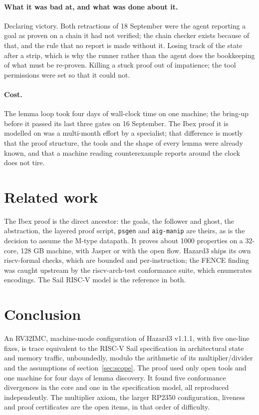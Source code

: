 \documentclass[11pt]{article}
\newcommand{\code}[1]{\texttt{#1}}
\begin{document}
\paragraph{What it was bad at, and what was done about it.}
Declaring victory. Both retractions of 18 September were the agent reporting a
goal as proven on a chain it had not verified; the chain checker exists
because of that, and the rule that no report is made without it. Losing track
of the state after a strip, which is why the runner rather than the agent
does the bookkeeping of what must be re-proven. Killing a stuck proof out of
impatience; the tool permissions were set so that it could not.

\paragraph{Cost.}
The lemma loop took four days of wall-clock time on one machine; the
bring-up before it passed its last three gates on 16 September. The Ibex proof it is modelled on was a multi-month effort by
a specialist; that difference is mostly that the proof structure, the tools
and the shape of every lemma were already known, and that a machine reading
counterexample reports around the clock does not tire.

\section{Related work}

The Ibex proof \cite{ibexformal} is the direct ancestor: the goals, the
follower and ghost, the abstraction, the layered proof script, \code{psgen} and
\code{aig-manip} are theirs, as is the decision to assume the M-type datapath.
It proves about 1000 properties on a 32-core, 128 GB machine, with Jasper or
with the open flow. Hazard3 ships its own riscv-formal \cite{riscvformal}
checks, which are bounded and per-instruction; the FENCE finding was caught
upstream by the riscv-arch-test conformance suite, which enumerates encodings.
The Sail RISC-V model \cite{sail} is the reference in both.

\section{Conclusion}

An RV32IMC, machine-mode configuration of Hazard3 v1.1.1, with five one-line
fixes, is trace equivalent to the RISC-V Sail specification in architectural
state and memory traffic, unboundedly, modulo the arithmetic of its
multiplier/divider and the assumptions of section~\ref{sec:scope}. The proof
used only open tools and one machine for four days of lemma discovery. It
found five conformance divergences in the core and one in the specification
model, all reproduced independently. The multiplier axiom, the larger RP2350
configuration, liveness and proof certificates are the open items, in that
order of difficulty.
\end{document}
